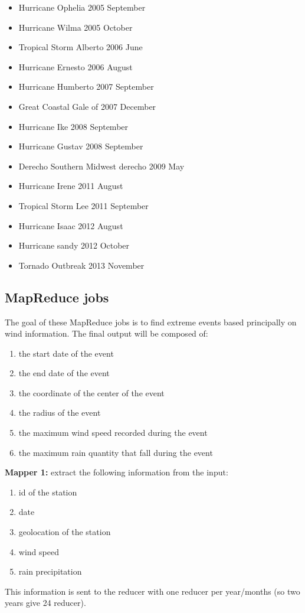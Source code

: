 \begin{multicols}{2}
\begin{itemize}
\item Hurricane Ophelia 2005 September
\item Hurricane Wilma 2005 October
\item Tropical Storm Alberto 2006 June
\item Hurricane Ernesto 2006 August
\item Hurricane Humberto 2007 September
\item Great Coastal Gale of 2007 December
\item Hurricane Ike 2008 September
\item Hurricane Gustav 2008 September
\item Derecho Southern Midwest derecho 2009 May
\item Hurricane Irene 2011 August
\item Tropical Storm Lee 2011 September
\item Hurricane Isaac 2012 August
\item Hurricane sandy 2012 October
\item Tornado Outbreak 2013 November
\end{itemize}
\end{multicols}

\subsection{MapReduce jobs}
The goal of these MapReduce jobs is to find extreme events based principally on wind information. The final output will be composed of:
\begin{enumerate}
\item the start date of the event
\item the end date of the event
\item the coordinate of the center of the event
\item the radius of the event
\item the maximum wind speed recorded during the event
\item the maximum rain quantity that fall during the event
\end{enumerate}

\textbf{Mapper 1:} extract the following information from the input:
\begin{enumerate}
\item id of the station
\item date
\item geolocation of the station
\item wind speed
\item rain precipitation
\end{enumerate}
This information is sent to the reducer with one reducer per year/months (so two years give 24 reducer).

